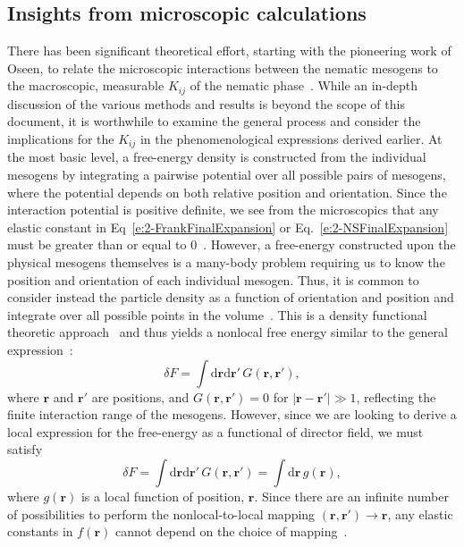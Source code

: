 \subsection{Insights from microscopic calculations}
There has been significant theoretical effort, starting with the pioneering work of Oseen, to relate the microscopic interactions between the nematic mesogens to the macroscopic, measurable $K_{ij}$ of the nematic phase~\cite{RN56,RN55,RN205,RN217,RN225,RN224,RN218,RN222}.
While an in-depth discussion of the various methods and results is beyond the scope of this document, it is worthwhile to examine the general process and consider the implications for the $K_{ij}$ in the phenomenological expressions derived earlier.
At the most basic level, a free-energy density is constructed from the individual mesogens by integrating a pairwise potential over all possible pairs of mesogens, where the potential depends on both relative position and orientation.
Since the interaction potential is positive definite, we see from the microscopics that any elastic constant in Eq~\ref{e:2-FrankFinalExpansion} or Eq.~\ref{e:2-NSFinalExpansion} must be greater than or equal to 0~\cite{RN205}.
However, a free-energy constructed upon the physical mesogens themselves is a many-body problem requiring us to know the position and orientation of each individual mesogen.
Thus, it is common to consider instead the particle density as a function of orientation and position and integrate over all possible points in the volume~\cite{RN222}.
This is a density functional theoretic approach~\cite{RN223} and thus yields a nonlocal free energy similar to the general expression~\cite{RN56,RN55}:
\begin{equation}
  \delta F = \int \textrm{d}\mathbf{r} \textrm{d}\mathbf{r}' \, G(\mathbf{r},\mathbf{r}'),
\end{equation}
where $\mathbf{r}$ and $\mathbf{r}'$ are positions, and $G(\mathbf{r},\mathbf{r}') = 0$ for $|\mathbf{r}-\mathbf{r}'| \gg 1$, reflecting the finite interaction range of the mesogens.
However, since we are looking to derive a local expression for the free-energy as a functional of director field, we must satisfy
\begin{equation}
  \delta F = \int \textrm{d}\mathbf{r} \textrm{d}\mathbf{r}' \, G(\mathbf{r},\mathbf{r}')
  = \int \textrm{d} \mathbf{r} \, g(\mathbf{r}),\label{e:2-NonlocalLocal}
\end{equation}
where $g(\mathbf{r})$ is a local function of position, $\mathbf{r}$.
Since there are an infinite number of possibilities to perform the nonlocal-to-local mapping $(\mathbf{r},\mathbf{r}') \rightarrow \mathbf{r}$, any elastic constants in $f(\mathbf{r})$ cannot depend on the choice of mapping~\cite{RN55}.
